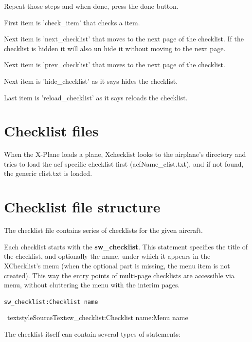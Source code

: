 \documentclass[11pt,parskip=half,a4paper]{scrartcl}
\newcommand\textstyleStrongEmphasis[1]{\textbf{#1}}
\newcommand\textstyleSourceText[1]{\texttt{#1}}
\begin{document}
Repeat those steps and when done, press the done button. 

First item is 'check\_item' that checks a item. 

Next item is 'next\_checklist' that moves to the next page of the checklist. If the checklist is hidden it 
will also un hide it without moving to the next page. 

Next item is 'prev\_checklist' that moves to the next page of the checklist.

Next item is 'hide\_checklist' as it says hides the checklist.

Last item is 'reload\_checklist' as it says reloads the checklist.

\newpage
\section{Checklist files}

When the X-Plane loads a plane, Xchecklist looks to the airplane's directory and tries to load the acf specific
checklist first (acfName\_clist.txt), and if not found, the generic clist.txt is loaded.


\section{Checklist file structure}

The checklist file contains series of checklists for the given aircraft.

Each checklist starts with the \textstyleStrongEmphasis{sw\_checklist}. This statement specifies the title of the checklist, and optionally the name, under which it appears in the XChecklist's menu (when the optional part is missing, the menu item is not created). This way the {\textquotedbl}entry points{\textquotedbl} of multi-page checklists are accessible via menu, without cluttering the menu with the interim pages.

\textstyleSourceText{sw\_checklist:Checklist name}

\ textstyleSourceText{sw\_checklist:Checklist name:Menu name}

The checklist itself can contain several types of statements:
\end{document}
